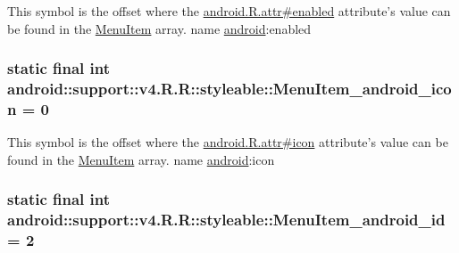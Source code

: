 This symbol is the offset where the \hyperlink{}{android.R.attr\#enabled} attribute's value can be found in the \hyperlink{classandroid_1_1support_1_1v4_1_1_r_1_1styleable_05493a7eeaa2bff09c4fbacbfb671ccc}{MenuItem} array.  name \hyperlink{namespaceandroid}{android}:enabled \hypertarget{classandroid_1_1support_1_1v4_1_1_r_1_1styleable_2c938bdde9b6c2d73c74e524bd9000a6}{
\subsubsection[{MenuItem\_\-android\_\-icon}]{\setlength{\rightskip}{0pt plus 5cm}static final int android::support::v4.R.R::styleable::MenuItem\_\-android\_\-icon = 0}}
\label{classandroid_1_1support_1_1v4_1_1_r_1_1styleable_2c938bdde9b6c2d73c74e524bd9000a6}


This symbol is the offset where the \hyperlink{}{android.R.attr\#icon} attribute's value can be found in the \hyperlink{classandroid_1_1support_1_1v4_1_1_r_1_1styleable_05493a7eeaa2bff09c4fbacbfb671ccc}{MenuItem} array.  name \hyperlink{namespaceandroid}{android}:icon \hypertarget{classandroid_1_1support_1_1v4_1_1_r_1_1styleable_0d7c59b15e49342fd0002c967ac93807}{
\subsubsection[{MenuItem\_\-android\_\-id}]{\setlength{\rightskip}{0pt plus 5cm}static final int android::support::v4.R.R::styleable::MenuItem\_\-android\_\-id = 2}}
\label{classandroid_1_1support_1_1v4_1_1_r_1_1styleable_0d7c59b15e49342fd0002c967ac93807}


